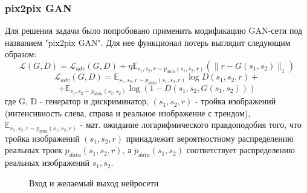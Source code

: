 \documentclass[9pt]{beamer}
\begin{document}
\begin{frame}\frametitle{pix2pix GAN}
	Для решения задачи было попробовано применить модификацию GAN-сети под названием "pix2pix GAN". Для нее функционал потерь выглядит следующим образом: $$ \mathcal{L}(G, D) = \mathcal{L}_{adv}(G, D) + \eta \mathbb{E}_{s_1, s_2, r \sim p_{data}(s_1, s_2, r)} (\parallel r - G(s_1, s_2) \parallel_1)$$
	$$ \mathcal{L}_{adv}(G, D) = \mathbb{E}_{s_1, s_2, r \sim p_{data}(s_1, s_2, r)}\log D(s_1, s_2, r) + $$ $$ + \mathbb{E}_{s_1, s_2 \sim p_{data}(s_1, s_2)} \log (1 - D(s_1, s_2, G(s_1, s_2)))$$
	где G, D - генератор и дискриминатор, $(s_1, s_2, r)$ - тройка изображений (интенсивность слева, справа и реальное изображение с трендом),  $\mathbb{E}_{s_1, s_2, r \sim p_{data}(s_1, s_2, r)}$ - мат. ожидание логарифмического правдоподобия того, что тройка изображений $(s_1, s_2, r)$ принадлежит вероятностному распределению реальных троек $p_{data}(s_1, s_2, r)$, а $p_{data}(s_1, s_2)$ соответствует распределению реальных изображений $s_1, s_2$. \\
	\begin{figure}
		\caption{Вход и желаемый выход нейросети}
	\end{figure}
\end{frame}
\end{document}
